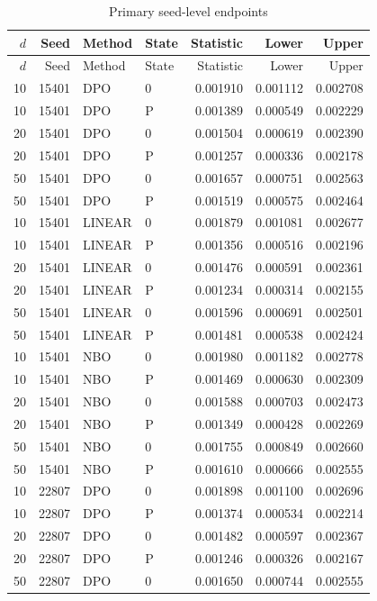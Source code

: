 \begingroup\small\setlength{\tabcolsep}{4pt}
\begin{longtable}{rrllrrr}
\caption{Primary seed-level endpoints}\label{tab:r12seeds}\\
\toprule
$d$ & Seed & Method & State & Statistic & Lower & Upper\\\midrule
\endfirsthead
\toprule
$d$ & Seed & Method & State & Statistic & Lower & Upper\\\midrule
\endhead
10 & 15401 & DPO & 0 & 0.001910 & 0.001112 & 0.002708\\
10 & 15401 & DPO & P & 0.001389 & 0.000549 & 0.002229\\
20 & 15401 & DPO & 0 & 0.001504 & 0.000619 & 0.002390\\
20 & 15401 & DPO & P & 0.001257 & 0.000336 & 0.002178\\
50 & 15401 & DPO & 0 & 0.001657 & 0.000751 & 0.002563\\
50 & 15401 & DPO & P & 0.001519 & 0.000575 & 0.002464\\
10 & 15401 & LINEAR & 0 & 0.001879 & 0.001081 & 0.002677\\
10 & 15401 & LINEAR & P & 0.001356 & 0.000516 & 0.002196\\
20 & 15401 & LINEAR & 0 & 0.001476 & 0.000591 & 0.002361\\
20 & 15401 & LINEAR & P & 0.001234 & 0.000314 & 0.002155\\
50 & 15401 & LINEAR & 0 & 0.001596 & 0.000691 & 0.002501\\
50 & 15401 & LINEAR & P & 0.001481 & 0.000538 & 0.002424\\
10 & 15401 & NBO & 0 & 0.001980 & 0.001182 & 0.002778\\
10 & 15401 & NBO & P & 0.001469 & 0.000630 & 0.002309\\
20 & 15401 & NBO & 0 & 0.001588 & 0.000703 & 0.002473\\
20 & 15401 & NBO & P & 0.001349 & 0.000428 & 0.002269\\
50 & 15401 & NBO & 0 & 0.001755 & 0.000849 & 0.002660\\
50 & 15401 & NBO & P & 0.001610 & 0.000666 & 0.002555\\
10 & 22807 & DPO & 0 & 0.001898 & 0.001100 & 0.002696\\
10 & 22807 & DPO & P & 0.001374 & 0.000534 & 0.002214\\
20 & 22807 & DPO & 0 & 0.001482 & 0.000597 & 0.002367\\
20 & 22807 & DPO & P & 0.001246 & 0.000326 & 0.002167\\
50 & 22807 & DPO & 0 & 0.001650 & 0.000744 & 0.002555\\

\end{longtable}
